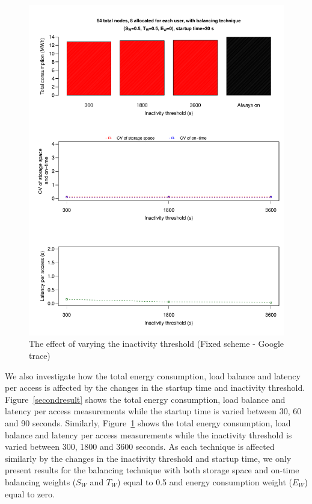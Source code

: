 \documentclass[preprint,12pt]{elsarticle}
\begin{document}
\begin{figure}[!htbp]
\centering
\includegraphics[width=\columnwidth,keepaspectratio]{FIG8.pdf}
\caption{The effect of varying the inactivity threshold (Fixed scheme - Google trace)}
\label{thirdresult}
\end{figure}

We also investigate how the total energy consumption, load balance and latency per access is affected by the changes in
the startup time and inactivity threshold. Figure~\ref{secondresult} shows the total energy consumption,
load balance and latency per access measurements while the startup time is varied between 30, 60 and 90 seconds. Similarly,
Figure~\ref{thirdresult} shows the total energy consumption, load balance and latency per access measurements while the
inactivity threshold is varied between 300, 1800 and 3600 seconds. As each technique is affected similarly by the changes
in the inactivity threshold and startup time, we only present results for the balancing technique with both storage space
and on-time balancing weights ($S_W$ and $T_W$) equal to 0.5 and energy consumption weight ($E_W$) equal to zero.
\end{document}
